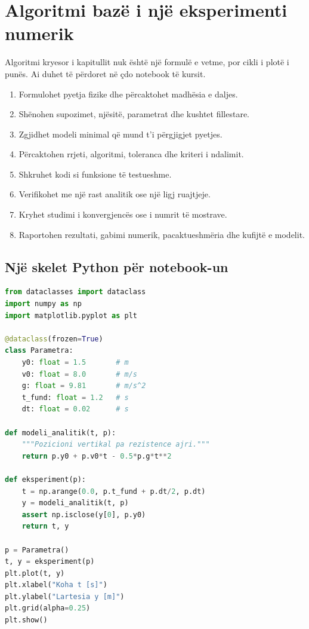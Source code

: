 \documentclass[11pt,oneside,openany]{book}
\begin{document}
\section{Algoritmi bazë i një eksperimenti numerik}
Algoritmi kryesor i kapitullit nuk është një formulë e vetme, por cikli i plotë i punës. Ai duhet të përdoret në çdo notebook të kursit.

\begin{enumerate}
\item Formulohet pyetja fizike dhe përcaktohet madhësia e daljes.
\item Shënohen supozimet, njësitë, parametrat dhe kushtet fillestare.
\item Zgjidhet modeli minimal që mund t'i përgjigjet pyetjes.
\item Përcaktohen rrjeti, algoritmi, toleranca dhe kriteri i ndalimit.
\item Shkruhet kodi si funksione të testueshme.
\item Verifikohet me një rast analitik ose një ligj ruajtjeje.
\item Kryhet studimi i konvergjencës ose i numrit të mostrave.
\item Raportohen rezultati, gabimi numerik, pacaktueshmëria dhe kufijtë e modelit.
\end{enumerate}

\subsection{Një skelet Python për notebook-un}
\begin{lstlisting}[language=Python,caption={Skelet minimal për një eksperiment numerik.}]
from dataclasses import dataclass
import numpy as np
import matplotlib.pyplot as plt

@dataclass(frozen=True)
class Parametra:
    y0: float = 1.5       # m
    v0: float = 8.0       # m/s
    g: float = 9.81       # m/s^2
    t_fund: float = 1.2   # s
    dt: float = 0.02      # s

def modeli_analitik(t, p):
    """Pozicioni vertikal pa rezistence ajri."""
    return p.y0 + p.v0*t - 0.5*p.g*t**2

def eksperiment(p):
    t = np.arange(0.0, p.t_fund + p.dt/2, p.dt)
    y = modeli_analitik(t, p)
    assert np.isclose(y[0], p.y0)
    return t, y

p = Parametra()
t, y = eksperiment(p)
plt.plot(t, y)
plt.xlabel("Koha t [s]")
plt.ylabel("Lartesia y [m]")
plt.grid(alpha=0.25)
plt.show()
\end{lstlisting}
\end{document}
